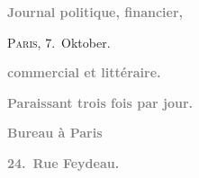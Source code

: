 \pstart
           \begin{otherlanguage}{french}\textcolor{gray}{\textbf{Journal politique, financier,}}\end{otherlanguage}\hfill \textsc{Paris}, 7. Oktober.\pend
           
\pstart
           \begin{otherlanguage}{french}\textcolor{gray}{\textbf{commercial et littéraire.}}\end{otherlanguage}\pend
           
\pstart
           \begin{otherlanguage}{french}\textcolor{gray}{\textbf{\textbf{Paraissant trois fois par jour.}}}\end{otherlanguage}\pend
           
\pstart
           \begin{otherlanguage}{french}\textcolor{gray}{\textbf{\textbf{Bureau à Paris}}}\end{otherlanguage}\pend
           
\pstart
           \begin{otherlanguage}{french}\textcolor{gray}{\textbf{\textbf{24. Rue Feydeau.}}}\end{otherlanguage}\pend
           
